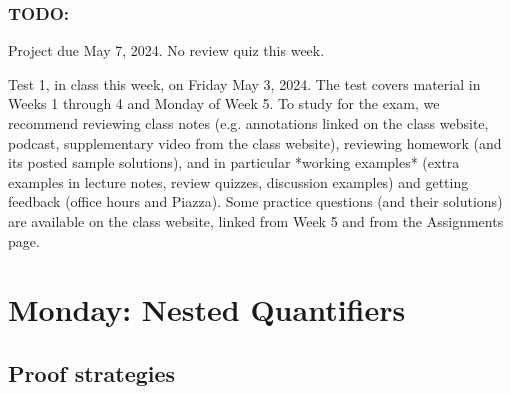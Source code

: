\subsubsection*{TODO:}
\begin{list}
   {\itemsep2pt}
   \item Project due May 7, 2024. No review quiz this week.
   \item Test 1, in class this week, on Friday May 3, 2024.
   The test covers material in Weeks 1 through 4 and Monday of Week 5. 
   To study for the exam, we recommend reviewing class notes 
   (e.g. annotations linked on the class website, podcast, supplementary video from the class website), 
   reviewing homework (and its posted sample solutions), and in particular *working examples* 
   (extra examples in lecture notes, review quizzes, discussion examples) and getting feedback (office hours and Piazza).
   Some practice questions (and their solutions) are available on the class website, linked from Week 5 and from the Assignments page.
\end{list}

\newpage

\begin{comment}
Removed definition of insertion, deletion, mutation from Wednesday of Week 4 -- when do we need them?

\newpage



\end{comment}

\section*{Monday: Nested Quantifiers}


\subsection*{Proof strategies}

%

\newpage


\newpage
